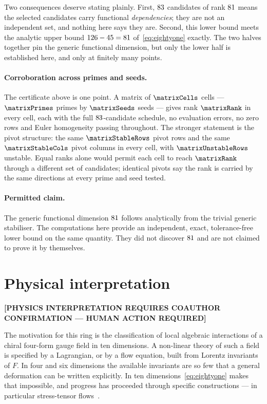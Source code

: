 \documentclass[11pt,a4paper]{article}
\newcommand{\HUMAN}[1]{\textbf{[#1 --- HUMAN ACTION REQUIRED]}}
\begin{document}
Two consequences deserve stating plainly. First, $83$ candidates of
rank $81$ means the selected candidates carry functional
\emph{dependencies}; they are not an independent set, and nothing here says they
are. Second, this lower bound meets the analytic upper bound
$126 - 45 = 81$
of~\eqref{eq:eightyone} exactly. The two halves together pin the generic
functional dimension, but only the lower half is established here, and only at
finitely many points.

\paragraph{Corroboration across primes and seeds.} The certificate above is
one point. A matrix of $\matrixCells$ cells --- $\matrixPrimes$ primes by
$\matrixSeeds$ seeds --- gives rank $\matrixRank$ in every cell, each with the
full $83$-candidate schedule, no evaluation errors, no zero rows
and Euler homogeneity passing throughout. The stronger statement is the pivot
structure: the same $\matrixStableRows$ pivot rows and the same
$\matrixStableCols$ pivot columns in every cell, with
$\matrixUnstableRows$ unstable. Equal ranks alone would permit each cell to
reach $\matrixRank$ through a different set of candidates; identical pivots say
the rank is carried by the same directions at every prime and seed tested.

\paragraph{Permitted claim.} The generic functional dimension
$81$ follows analytically from the trivial generic stabiliser.
The computations here provide an independent, exact, tolerance-free lower bound
on the same quantity. They did not discover $81$ and are not
claimed to prove it by themselves.

\section{Physical interpretation}
\label{sec:physics}

\HUMAN{PHYSICS INTERPRETATION REQUIRES COAUTHOR CONFIRMATION}

The motivation for this ring is the classification of local algebraic
interactions of a chiral four-form gauge field in ten dimensions. A non-linear
theory of such a field is specified by a Lagrangian, or by a flow equation, built
from Lorentz invariants of $F$. In four and six dimensions the available
invariants are so few that a general deformation can be written explicitly. In
ten dimensions~\eqref{eq:eightyone} makes that impossible, and progress has
proceeded through specific constructions --- in particular stress-tensor
flows~\cite{Hutomo:2025chiral}.
\end{document}
